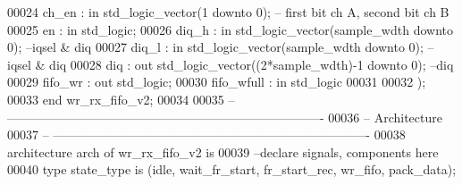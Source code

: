 \begin{DoxyCode}
00024             \textcolor{vhdlchar}{ch_en}           \textcolor{vhdlchar}{:} \textcolor{keywordflow}{in} \textcolor{comment}{std\_logic\_vector}\textcolor{vhdlchar}{(}\textcolor{vhdllogic}{}\textcolor{vhdllogic}{1} \textcolor{keywordflow}{downto} \textcolor{vhdllogic}{}\textcolor{vhdllogic}{0}\textcolor{vhdlchar}{)};\textcolor{keyword}{ -- first bit ch A, second bit ch B}
00025             \textcolor{vhdlchar}{en}              \textcolor{vhdlchar}{:} \textcolor{keywordflow}{in} \textcolor{comment}{std\_logic};
00026             \textcolor{vhdlchar}{diq_h}           \textcolor{vhdlchar}{:} \textcolor{keywordflow}{in} \textcolor{comment}{std\_logic\_vector}\textcolor{vhdlchar}{(}\textcolor{vhdlchar}{sample_wdth} \textcolor{keywordflow}{downto} \textcolor{vhdllogic}{}\textcolor{vhdllogic}{0}\textcolor{vhdlchar}{)};\textcolor{keyword}{    --iqsel & diq}
00027             \textcolor{vhdlchar}{diq_l}           \textcolor{vhdlchar}{:} \textcolor{keywordflow}{in} \textcolor{comment}{std\_logic\_vector}\textcolor{vhdlchar}{(}\textcolor{vhdlchar}{sample_wdth} \textcolor{keywordflow}{downto} \textcolor{vhdllogic}{}\textcolor{vhdllogic}{0}\textcolor{vhdlchar}{)};\textcolor{keyword}{    --iqsel & diq}
00028             \textcolor{vhdlchar}{diq}         \textcolor{vhdlchar}{:} \textcolor{keywordflow}{out} \textcolor{comment}{std\_logic\_vector}\textcolor{vhdlchar}{(}\textcolor{vhdlchar}{(}\textcolor{vhdllogic}{}\textcolor{vhdllogic}{2}\textcolor{vhdlchar}{*}\textcolor{vhdlchar}{sample_wdth}\textcolor{vhdlchar}{)}\textcolor{vhdlchar}{-}\textcolor{vhdllogic}{}\textcolor{vhdllogic}{1} \textcolor{keywordflow}{downto} \textcolor{vhdllogic}{}\textcolor{vhdllogic}{0}\textcolor{vhdlchar}{)};\textcolor{keyword}{ --diq}
00029             \textcolor{vhdlchar}{fifo_wr}     \textcolor{vhdlchar}{:} \textcolor{keywordflow}{out} \textcolor{comment}{std\_logic};
00030             \textcolor{vhdlchar}{fifo_wfull}  \textcolor{vhdlchar}{:} \textcolor{keywordflow}{in} \textcolor{comment}{std\_logic}
00031  
00032         \textcolor{vhdlchar}{)};
00033 \textcolor{keywordflow}{end} \textcolor{vhdlchar}{wr\_rx\_fifo\_v2};
00034 
00035 \textcolor{keyword}{-- ----------------------------------------------------------------------------}
00036 \textcolor{keyword}{-- Architecture}
00037 \textcolor{keyword}{-- ----------------------------------------------------------------------------}
00038 \textcolor{keywordflow}{architecture} arch \textcolor{keywordflow}{of} wr_rx_fifo_v2 is
00039 \textcolor{keyword}{--declare signals,  components here}
00040 \textcolor{keywordflow}{type} \textcolor{vhdlchar}{state_type} \textcolor{keywordflow}{is} \textcolor{vhdlchar}{(}\textcolor{vhdlchar}{idle}\textcolor{vhdlchar}{,} \textcolor{vhdlchar}{wait\_fr\_start}\textcolor{vhdlchar}{,} \textcolor{vhdlchar}{fr\_start\_rec}\textcolor{vhdlchar}{,} \textcolor{vhdlchar}{wr\_fifo}\textcolor{vhdlchar}{,} \textcolor{vhdlchar}{pack\_data}\textcolor{vhdlchar}{)};

\end{DoxyCode}

